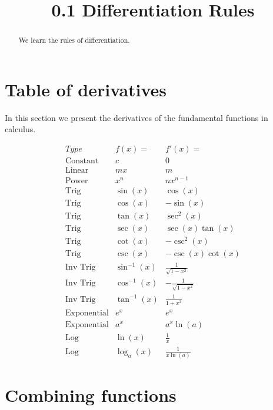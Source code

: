 \documentclass[handout]{ximera}
\title{0.1 Differentiation Rules}
\begin{document}
\begin{abstract}
We learn the rules of differentiation.
\end{abstract}

\maketitle


\section{Table of derivatives}

In this section we present the derivatives of the fundamental functions in calculus.  

\begin{center}
\[
\begin{array}{c|c|c}
		Type & f(x)= & f'(x)=  \\
		\hline
		\text{Constant} & c & 0 \\
		\text{Linear} & mx & m  \\
		\text{Power} & x^n & nx^{n-1}  \\
		\hline
		\text{Trig} & \sin(x) & \cos(x) \\
		\text{Trig} & \cos(x) & -\sin(x) \\
		\hline
		\text{Trig} & \tan(x) & \sec^2(x) \\
		\text{Trig} & \sec(x) & \sec(x)\tan(x) \\
		\hline
		\text{Trig} & \cot(x) & -\csc^2(x)\ \\
		\text{Trig} & \csc(x) & -\csc(x)\cot(x) \\
		\hline
		\text{Inv Trig} & \sin^{-1}(x) & \frac{1}{\sqrt{1-x^2}} \\
		\text{Inv Trig} & \cos^{-1}(x) & -\frac{1}{\sqrt{1-x^2}} \\
		\text{Inv Trig} & \tan^{-1}(x) & \frac{1}{1+x^2} \\
		\hline
		\text{Exponential} & e^x & e^x \\
		\text{Exponential} & a^x & a^x\ln(a) \\
		\hline
		\text{Log} & \ln(x) & \frac{1}{x} \\
		\text{Log} & \log_a(x) & \frac{1}{x\ln(a)}
	\end{array}
    \]
\end{center}


\section{Combining functions}
\end{document}
